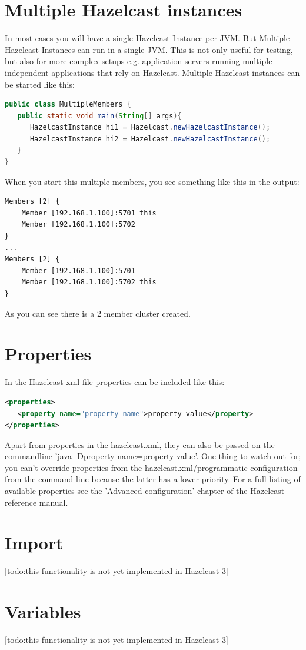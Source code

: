 \section{Multiple Hazelcast instances}
In most cases you will have a single Hazelcast Instance per JVM. But Multiple Hazelcast Instances can run in a single JVM. This is not only useful for testing, but also for more complex setups e.g. application servers running multiple independent applications that rely on Hazelcast. Multiple Hazelcast instances can be started like this:
\begin{lstlisting}[language=java]
public class MultipleMembers {
   public static void main(String[] args){
      HazelcastInstance hi1 = Hazelcast.newHazelcastInstance();
      HazelcastInstance hi2 = Hazelcast.newHazelcastInstance();
   }
}
\end{lstlisting}
When you start this multiple members, you see something like this in the output:
\begin{lstlisting}
Members [2] {
    Member [192.168.1.100]:5701 this
    Member [192.168.1.100]:5702
}
...
Members [2] {
    Member [192.168.1.100]:5701
    Member [192.168.1.100]:5702 this
}
\end{lstlisting}
As you can see there is a 2 member cluster created.

\section{Properties}
In the Hazelcast xml file properties can be included like this:
\begin{lstlisting}[language=xml]
<properties>
   <property name="property-name">property-value</property>
</properties>
\end{lstlisting}
 Apart from properties in the hazelcast.xml, they can also be passed on the commandline 'java -Dproperty-name=property-value'. One thing to watch out for; you can't override properties from the hazelcast.xml/programmatic-configuration from the command line because the latter has a lower priority. For a full listing of available properties see the 'Advanced configuration' chapter of the Hazelcast reference manual.

\section{Import}
[todo:this functionality is not yet implemented in Hazelcast 3]

\section{Variables}
[todo:this functionality is not yet implemented in Hazelcast 3]

